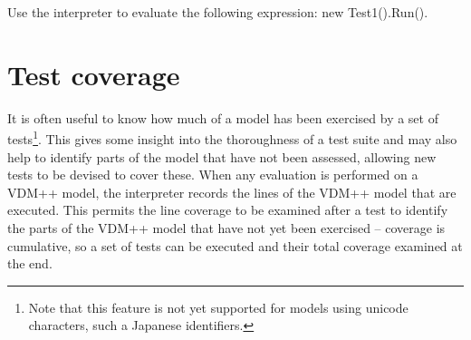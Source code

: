 

\begin{myexercise}
\label{ex:tool-monitor}Use the interpreter to evaluate the
  following expression: {\ttfamily new Test1().Run()}.
\end{myexercise}
%
\section{Test coverage}\label{sec:testcov}
It is often useful to know how much of a model has been exercised by a set of tests\footnote{Note that this feature is not yet supported for   models using unicode characters, such a Japanese identifiers.}. This gives some insight into the thoroughness of a test suite and may also help to identify parts of the model that have not been assessed, allowing new tests to be devised to cover these. When any evaluation is performed on a VDM++ model, the interpreter records the lines of the VDM++ model that are executed. This permits the line coverage to be examined after a test to identify the parts of the VDM++ model that have not yet been exercised -- coverage is cumulative, so a set of tests can be executed and their total coverage examined at the end.

